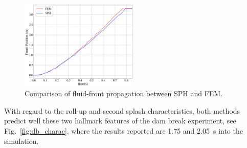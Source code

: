 \documentclass[final,3p,times]{elsarticle}
\begin{document}
\begin{figure}[H]
	\begin{center}
		\includegraphics[width=0.5\textwidth]{Images/Figure_damBreak.png}
	\end{center}
	\caption{Comparison of fluid-front propagation between SPH and FEM.}
	\label{fig:db_front}
\end{figure}
With regard to the roll-up and second splash characteristics, both methods predict well these two hallmark features of the dam break experiment, see Fig.~\ref{fig:db_charac}, where the results reported are \SI{1.75}{} and \SI{2.05}{s} into the simulation.
\end{document}
